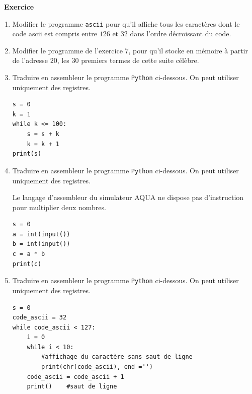 \documentclass[a4paper, french, 11pt]{article}  %
\newcounter{exercice}
\newenvironment{exercice}[1]
{\par \medskip   \addtocounter{exercice}{1} \noindent  
\begin{bclogo}[arrondi =0.1,   noborder = true, logo=\bccrayon, marge=4]{~\textbf{Exercice} \textbf{\theexercice} {\itshape #1} }  \par}
{
\end{bclogo}
 \par \bigskip }
\newcounter{prog}
\begin{document}
\begin{exercice}{}

\begin{enumerate}
	\item Modifier le programme \texttt{ascii} pour qu'il affiche tous les caractères dont le code ascii est compris entre $126$ et $32$ dans l'ordre décroissant du code.
	
	\item Modifier le programme de l'exercice 7, pour qu'il stocke en mémoire à partir de l'adresse $20$, les $30$ premiers termes de cette suite célèbre.
	
	\item Traduire en assembleur le programme \texttt{Python} ci-dessous. On peut utiliser uniquement des registres.
	
\begin{lstlisting}[style=rond]
s = 0
k = 1
while k <= 100:
	s = s + k
	k = k + 1
print(s)
\end{lstlisting}

	\item Traduire en assembleur le programme \texttt{Python} ci-dessous. On peut utiliser uniquement des registres.

\bcattention{} Le langage d'assembleur du simulateur AQUA ne dispose pas d'instruction pour multiplier deux nombres.

 
\begin{lstlisting}[style=rond]s = 0
a = int(input())
b = int(input())
c = a * b
print(c)
\end{lstlisting}


\item Traduire en assembleur le programme \texttt{Python} ci-dessous. On peut utiliser uniquement des registres.

\begin{lstlisting}[style=rond]s = 0
code_ascii = 32
while code_ascii < 127:
	i = 0
	while i < 10:
		#affichage du caractère sans saut de ligne
		print(chr(code_ascii), end ='') 
    code_ascii = code_ascii + 1
	print()    #saut de ligne
\end{lstlisting}

\end{enumerate}

\end{exercice}
\end{document}
